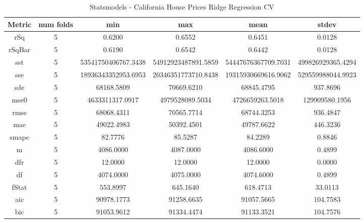 \documentclass{article}
\begin{document}
\begin{table}[H]
\centering
\caption{Statsmodels - California House Prices Ridge Regression CV}
\label{tab:Statsmodels - California House Prices Ridge Regression CV}
\begin{tabular}{|c|c|c|c|c|c|}\hline
Metric & num folds & min & max & mean & stdev \\ \hline \hline
rSq & 5 & 0.6200 & 0.6552 & 0.6451 & 0.0128 \\ \hline
rSqBar & 5 & 0.6190 & 0.6542 & 0.6442 & 0.0128 \\ \hline
sst & 5 & 53541750406767.3438 & 54912923487891.5859 & 54447676367709.7031 & 499826929365.4294 \\ \hline
sse & 5 & 18936343352953.6953 & 20346351773710.8438 & 19315930669616.9062 & 529559988044.9923 \\ \hline
sde & 5 & 68168.5809 & 70669.6210 & 68845.4795 & 937.8696 \\ \hline
mse0 & 5 & 4633311317.0917 & 4979528089.5034 & 4726659263.5018 & 129909580.1956 \\ \hline
rmse & 5 & 68068.4311 & 70565.7714 & 68744.3253 & 936.4847 \\ \hline
mae & 5 & 49022.4983 & 50392.4501 & 49787.6622 & 446.3236 \\ \hline
smape & 5 & 82.7776 & 85.5287 & 84.2289 & 0.8846 \\ \hline
m & 5 & 4086.0000 & 4087.0000 & 4086.6000 & 0.4899 \\ \hline
dfr & 5 & 12.0000 & 12.0000 & 12.0000 & 0.0000 \\ \hline
df & 5 & 4074.0000 & 4075.0000 & 4074.6000 & 0.4899 \\ \hline
fStat & 5 & 553.8997 & 645.1640 & 618.4713 & 33.0113 \\ \hline
aic & 5 & 90978.1773 & 91258.6635 & 91057.5665 & 104.7583 \\ \hline
bic & 5 & 91053.9612 & 91334.4474 & 91133.3521 & 104.7576 \\ \hline
\end{tabular}
\end{table}
\end{document}
